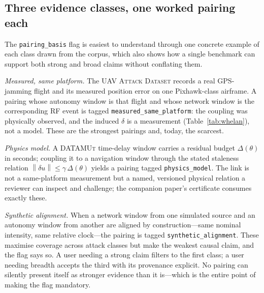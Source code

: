 \documentclass[conference]{IEEEtran}
\newcommand{\dataset}[1]{\textsc{#1}}
\newcommand{\code}[1]{\texttt{#1}}
\newcommand{\Norm}[1]{\left\lVert #1\right\rVert}
\begin{document}
\subsection{Three evidence classes, one worked pairing each}
The \code{pairing\_basis} flag is easiest to understand through one concrete
example of each class drawn from the corpus, which also shows how a single
benchmark can support both strong and broad claims without conflating them.

\emph{Measured, same platform.} The \dataset{UAV Attack Dataset} records a real
GPS-jamming flight and its measured position error on one Pixhawk-class airframe.
A pairing whose autonomy window is that flight and whose network window is the
corresponding RF event is tagged \code{measured\_same\_platform}: the coupling
was physically observed, and the induced $\delta$ is a measurement
(Table~\ref{tab:whelan}), not a model. These are the strongest pairings and,
today, the scarcest.

\emph{Physics model.} A \dataset{DATAMUt} time-delay window carries a residual
budget $\Delta(\theta)$ in seconds; coupling it to a navigation window through
the stated staleness relation $\Norm{\delta u}\le\gamma\,\Delta(\theta)$ yields a
pairing tagged \code{physics\_model}. The link is not a same-platform
measurement but a named, versioned physical relation a reviewer can inspect and
challenge; the companion paper's certificate consumes exactly these.

\emph{Synthetic alignment.} When a network window from one simulated source and
an autonomy window from another are aligned by construction---same nominal
intensity, same relative clock---the pairing is tagged
\code{synthetic\_alignment}. These maximise coverage across attack classes but
make the weakest causal claim, and the flag says so. A user needing a strong
claim filters to the first class; a user needing breadth accepts the third with
its provenance explicit. No pairing can silently present itself as stronger
evidence than it is---which is the entire point of making the flag mandatory.
\end{document}
